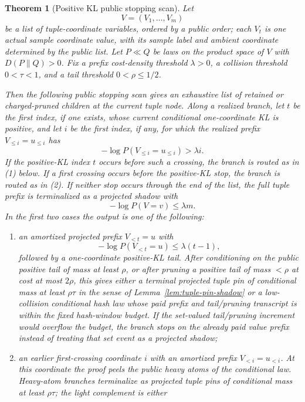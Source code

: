 \documentclass[11pt]{article}
\newtheorem{theorem}{Theorem}[section]
\begin{document}
\begin{theorem}[Positive KL public stopping scan]
\label{thm:positive-kl-public}
Let
\[
  V=(V_1,\ldots,V_m)
\]
be a list of tuple-coordinate variables, ordered by a public order; each
$V_t$ is one actual sample coordinate value, with its sample label and ambient
coordinate determined by the public list.  Let $P\ll Q$ be laws on the product
space of $V$ with $D(P\|Q)>0$.  Fix a prefix cost-density threshold
$\lambda>0$, a collision threshold $0<\tau<1$, and a tail threshold
$0<\rho\le 1/2$.

Then the following public stopping scan gives an exhaustive list of retained or
charged-pruned children at the current tuple node.  Along a realized branch, let
$t$ be the first index, if one exists, whose current conditional one-coordinate
KL is positive, and let $i$ be the first index, if any, for which the realized prefix
$V_{\le i}=u_{\le i}$ has
\[
  -\log P(V_{\le i}=u_{\le i})>\lambda i .
\]
If the positive-KL index $t$ occurs before such a crossing, the branch is routed
as in \textup{(1)} below.  If a first crossing occurs before the positive-KL
stop, the branch is routed as in \textup{(2)}.  If neither stop occurs through
the end of the list, the full tuple prefix is terminalized as a projected shadow
with
\[
  -\log P(V=v)\le \lambda m .
\]
In the first two cases the output is one of the following:
  \begin{enumerate}[label=\textup{(\arabic*)}]
\item an amortized projected prefix $V_{<t}=u$ with
  \[
    -\log P(V_{<t}=u)\le \lambda(t-1),
  \]
  followed by a one-coordinate positive-KL tail.  After conditioning on the
  public positive tail of mass at least $\rho$, or after pruning a positive
  tail of mass $<\rho$ at cost at most $2\rho$, this gives either a terminal
  projected tuple pin of conditional mass at least $\rho\tau$ in the sense of
  Lemma~\ref{lem:tuple-pin-shadow} or a low-collision conditional hash law
  whose paid prefix and tail/pruning transcript is within the fixed
  hash-window budget.  If the set-valued tail/pruning increment would overflow
  the budget, the branch stops on the already paid value prefix instead of
  treating that set event as a projected shadow;
\item an earlier first-crossing coordinate $i$ with an amortized prefix
  $V_{<i}=u_{<i}$.  At this coordinate the proof peels the public heavy atoms
  of the conditional law.  Heavy-atom branches terminalize as projected tuple
  pins of conditional mass at least $\rho\tau$; the light complement is either

\end{enumerate}
\end{theorem}
\end{document}
